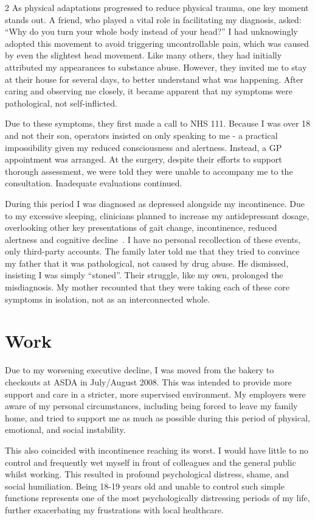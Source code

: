 \documentclass{article}
\begin{document}
\begin{multicols}{2}
As physical adaptations progressed to reduce physical trauma, one key moment stands out. A friend, who played a vital role in facilitating my diagnosis, asked:
“Why do you turn your whole body instead of your head?”
I had unknowingly adopted this movement to avoid triggering uncontrollable pain, which was caused by even the slightest head movement. Like many others, they had initially attributed my appearances to substance abuse. However, they invited me to stay at their house for several days, to better understand what was happening. After caring and observing me closely, it became apparent that my symptoms were pathological, not self-inflicted.

Due to these symptoms, they first made a call to NHS 111. Because I was over 18 and not their son, operators insisted on only speaking to me - a practical impossibility given my reduced consciousness and alertness. Instead, a GP appointment was arranged. At the surgery, despite their efforts to support thorough assessment, we were told they were unable to accompany me to the consultation. Inadequate evaluations continued.

During this period I was diagnosed as depressed alongside my incontinence. Due to my excessive sleeping, clinicians planned to increase my antidepressant dosage, overlooking other key presentations of gait change, incontinence, reduced alertness and cognitive decline~\cite{houghton2021,jones2008,shefer2014,henderson2014}. I have no personal recollection of these events, only third-party accounts. The family later told me that they tried to convince my father that it was pathological, not caused by drug abuse. He dismissed, insisting I was simply “stoned”. Their struggle, like my own, prolonged the misdiagnosis. My mother recounted that they were taking each of these core symptoms in isolation, not as an interconnected whole.

\section*{Work}
Due to my worsening executive decline, I was moved from the bakery to checkouts at ASDA in July/August 2008. This was intended to provide more support and care in a stricter, more supervised environment. My employers were aware of my personal circumstances, including being forced to leave my family home, and tried to support me as much as possible during this period of physical, emotional, and social instability.

This also coincided with incontinence reaching its worst. I would have little to no control and frequently wet myself in front of colleagues and the general public whilst working. This resulted in profound psychological distress, shame, and social humiliation. Being 18-19 years old and unable to control such simple functions represents one of the most psychologically distressing periods of my life, further exacerbating my frustrations with local healthcare.


\end{multicols}
\end{document}
